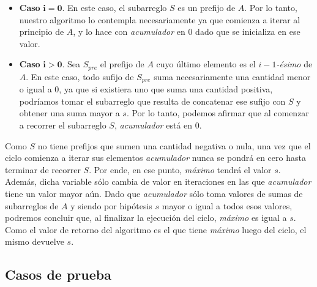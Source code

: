 \begin{itemize}
    \item \textbf{Caso} $\mathbf{i = 0}$. En este caso, el subarreglo $S$ es un prefijo de $A$. Por lo tanto, nuestro algoritmo lo contempla necesariamente ya que comienza a iterar al principio de $A$, y lo hace con \textit{acumulador} en $0$ dado que se inicializa en ese valor.

    \item \textbf{Caso} $\mathbf{i > 0}$. Sea $S_{pre}$ el prefijo de $A$ cuyo último elemento es el $i-1$\textit{-ésimo} de $A$. En este caso, todo sufijo de $S_{pre}$ suma necesariamente una cantidad menor o igual a $0$, ya que si existiera uno que suma una cantidad positiva, podríamos tomar el subarreglo que resulta de concatenar ese sufijo con $S$ y obtener una suma mayor a $s$. Por lo tanto, podemos afirmar que al comenzar a recorrer el subarreglo $S$, \textit{acumulador} está en $0$.
\end{itemize}

Como $S$ no tiene prefijos que sumen una cantidad negativa o nula, una vez que el ciclo comienza a iterar sus elementos \textit{acumulador} nunca se pondrá en cero hasta terminar de recorrer $S$. Por ende, en ese punto, \textit{máximo} tendrá el valor $s$. Además, dicha variable sólo cambia de valor en iteraciones en las que \textit{acumulador} tiene un valor mayor aún. Dado que \textit{acumulador} sólo toma valores de sumas de subarreglos de $A$ y siendo por hipótesis $s$ mayor o igual a todos esos valores, podremos concluir que, al finalizar la ejecución del ciclo, \textit{máximo} es igual a $s$. Como el valor de retorno del algoritmo es el que tiene \textit{máximo} luego del ciclo, el mismo devuelve $s$.

\subsection{Casos de prueba}
